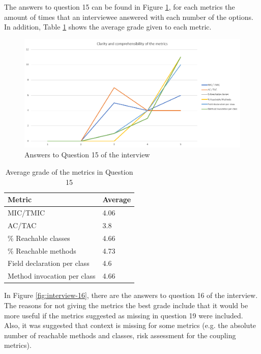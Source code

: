 The answers to question 15 can be found in Figure \ref{fig:interview-15}, for each metrics the amount of times that an interviewee answered with each number of the options. In addition, Table \ref{table:interview-15} shows the average grade given to each metric.

\begin{figure}[ht]
\begin{center}
\includegraphics[width=\textwidth]{figures/interview/Question15.png}
\caption{Answers to Question 15 of the interview}
\label{fig:interview-15}
\end{center}
\end{figure}

\begin{table}[ht]
    \begin{center}
    \begin{tabular}{|l|l|}
    \hline
    Metric & Average \\
    \hline
    MIC/TMIC & 4.06 \\
    AC/TAC & 3.8 \\
    \% Reachable classes & 4.66 \\
    \% Reachable methods & 4.73 \\
    Field declaration per class & 4.6 \\
    Method invocation per class & 4.66 \\
    \hline
    \end{tabular}
    \end{center}
    \caption{Average grade of the metrics in Question 15}
    \label{table:interview-15}
\end{table}

In Figure \ref{fig:interview-16}, there are the answers to question 16 of the interview. The reasons for not giving the metrics the best grade include that it would be more useful if the metrics suggested as missing in question 19 were included. Also, it was suggested that context is missing for some metrics (e.g. the absolute number of reachable methods and classes, risk assessment for the coupling metrics).

